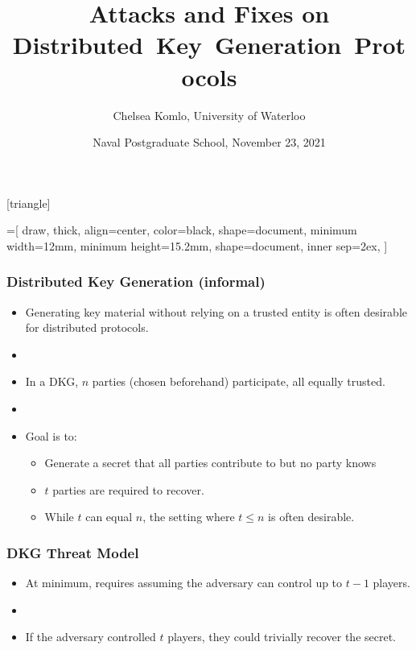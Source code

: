 \documentclass[hyperref={pdfpagelabels=true},table,dvipsnames,14pt,aspectratio=169]{beamer}
\title{Attacks and Fixes on Distributed~Key~Generation~Protocols}
\author{Chelsea Komlo, University of Waterloo}
\date[November 2021]{ Naval Postgraduate School, November 23, 2021}
\begin{document}
[triangle]

=[%
draw,
thick,
align=center,
color=black,
shape=document,
minimum width=12mm,
minimum height=15.2mm,
shape=document,
inner sep=2ex,
]

\begin{frame}
        \thispagestyle{empty}
        \maketitle
\end{frame}


\begin{frame}
  \frametitle{Distributed Key Generation (informal)}

  \begin{itemize}
    \item<1-> Generating key material without relying on a trusted entity is often desirable for distributed protocols.
    \item[]
    \item<2-> In a DKG, $n$ parties (chosen beforehand) participate, all equally trusted.
    \item[]
    \item<3-> Goal is to:
  \begin{itemize}
    \item<4-> Generate a secret that all parties contribute to but no party knows
    \item<5-> $t$ parties are required to recover.
    \item<6-> While $t$ can equal $n$, the setting where $t \leq n$ is often desirable.
  \end{itemize}
  \end{itemize}
\end{frame}

\begin{frame}
  \frametitle{DKG Threat Model}

  \begin{itemize}
    \item<1-> At minimum, requires assuming the adversary can control up to $t-1$ players.
    \item[]
    \item<2-> If the adversary controlled $t$ players, they could trivially recover the secret.
  \end{itemize}
\end{frame}
\end{document}
